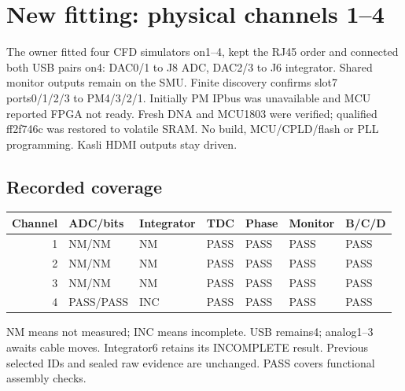 \clearpage
\section{New fitting: physical channels 1--4}
The owner fitted four CFD simulators on1--4, kept the RJ45 order and connected
both USB pairs on4: DAC0/1 to J8 ADC, DAC2/3 to J6 integrator. Shared monitor
outputs remain on the SMU. Finite discovery confirms slot7 ports0/1/2/3 to PM4/3/2/1.
Initially PM IPbus was unavailable and MCU reported FPGA not ready. Fresh DNA
and MCU1803 were verified; qualified ff2f746c was restored to volatile SRAM.
No build, MCU/CPLD/flash or PLL programming. Kasli HDMI outputs stay driven.
\subsection{Recorded coverage}
\begin{center}\begin{tabular}{rllllll}\toprule
Channel & ADC/bits & Integrator & TDC & Phase & Monitor & B/C/D\\\midrule
1 & NM/NM & NM & PASS & PASS & PASS & PASS\\
2 & NM/NM & NM & PASS & PASS & PASS & PASS\\
3 & NM/NM & NM & PASS & PASS & PASS & PASS\\
4 & PASS/PASS & INC & PASS & PASS & PASS & PASS\\
\bottomrule\end{tabular}\end{center}
NM means not measured; INC means incomplete. USB remains4; analog1--3 awaits
cable moves. Integrator6 retains its INCOMPLETE result. Previous selected IDs
and sealed raw evidence are unchanged. PASS covers functional assembly checks.
